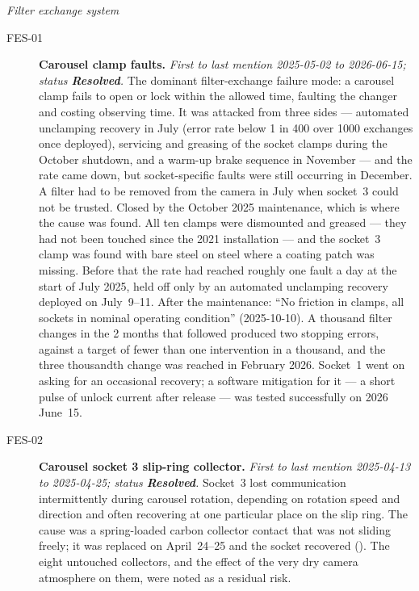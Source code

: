 \noindent\textit{Filter exchange system}
\begin{description}
\item[FES-01]\label{iss:FES-01} \textbf{Carousel clamp faults.}
  \emph{First to last mention 2025-05-02 to 2026-06-15; status \textcolor{stres}{\textbf{Resolved}}.}
  The dominant filter-exchange failure mode: a carousel clamp fails to open or lock within the allowed time, faulting the changer and costing observing time.  It was attacked from three sides --- automated unclamping recovery in July (error rate below 1 in 400 over 1000 exchanges once deployed), servicing and greasing of the socket clamps during the October shutdown, and a warm-up brake sequence in November --- and the rate came down, but socket-specific faults were still occurring in December.  A filter had to be removed from the camera in July when socket~3 could not be trusted.  Closed by the October 2025 maintenance, which is where the cause was found.  All ten clamps were dismounted and greased --- they had not been touched since the 2021 installation --- and the socket~3 clamp was found with bare steel on steel where a coating patch was missing.  Before that the rate had reached roughly one fault a day at the start of July 2025, held off only by an automated unclamping recovery deployed on July~9--11.  After the maintenance: ``No friction in clamps, all sockets in nominal operating condition'' (2025-10-10).  A thousand filter changes in the 2 months that followed produced two stopping errors, against a target of fewer than one intervention in a thousand, and the three thousandth change was reached in February 2026.  Socket~1 went on asking for an occasional recovery; a software mitigation for it --- a short pulse of unlock current after release --- was tested successfully on 2026 June~15.

\item[FES-02]\label{iss:FES-02} \textbf{Carousel socket 3 slip-ring collector.}
  \emph{First to last mention 2025-04-13 to 2025-04-25; status \textcolor{stres}{\textbf{Resolved}}.}
  Socket~3 lost communication intermittently during carousel rotation, depending on rotation speed and direction and often recovering at one particular place on the slip ring.  The cause was a spring-loaded carbon collector contact that was not sliding freely; it was replaced on April~24--25 and the socket recovered ().  The eight untouched collectors, and the effect of the very dry camera atmosphere on them, were noted as a residual risk.


\end{description}
